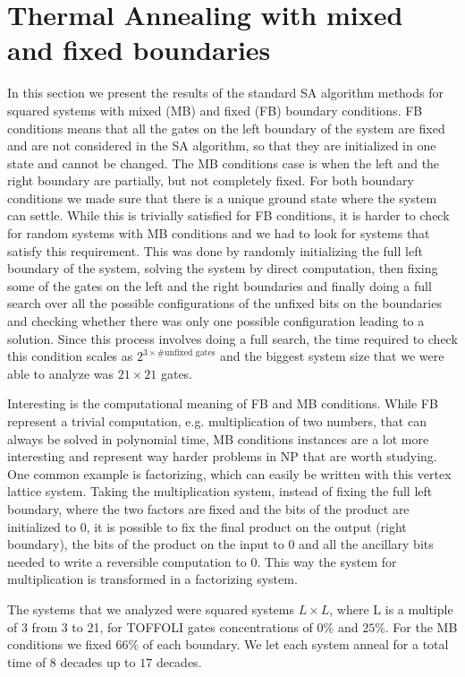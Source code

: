 \section{Thermal Annealing with mixed and fixed boundaries}

In this section we present the results of the standard SA algorithm methods for squared systems with mixed (MB) and fixed (FB) boundary conditions.
FB conditions means that all the gates on the left boundary of the system are fixed and are not considered in the SA algorithm, so that they are initialized in one state and cannot be changed.
The MB conditions case is when the left and the right boundary are partially, but not completely fixed.
For both boundary conditions we made sure that there is a unique ground state where the system can settle.
While this is trivially satisfied for FB conditions, it is harder to check for random systems with MB conditions and we had to look for systems that satisfy this requirement.
This was done by randomly initializing the full left boundary of the system, solving the system by direct computation, then fixing some of the gates on the left and the right boundaries and finally doing a full search over all the possible configurations of the unfixed bits on the boundaries and checking whether there was only one possible configuration leading to a solution.
Since this process involves doing a full search, the time required to check this condition scales as $2^{3\times \# \text{unfixed gates}}$ and the biggest system size that we were able to analyze was $21\times 21$ gates.

Interesting is the computational meaning of FB and MB conditions.
While FB represent a trivial computation, e.g. multiplication of two numbers, that can always be solved in polynomial time, MB conditions instances are a lot more interesting and represent way harder problems in NP that are worth studying.
One common example is factorizing, which can easily be written with this vertex lattice system.
Taking the multiplication system, instead of fixing the full left boundary, where the two factors are fixed and the bits of the product are initialized to 0, it is possible to fix the final product on the output (right boundary), the bits of the product on the input to 0 and all the ancillary bits needed to write a reversible computation to 0.
This way the system for multiplication is transformed in a factorizing system.

The systems that we analyzed were squared systems $L\times L$, where L is a multiple of 3 from 3 to 21, for TOFFOLI gates concentrations of $0\%$ and $25\%$.
For the MB conditions we fixed $66\%$ of each boundary.
We let each system anneal for a total time of $8$ decades up to $17$ decades.

